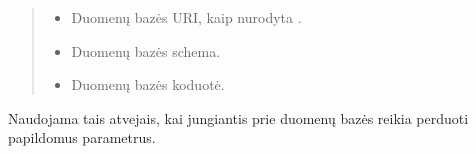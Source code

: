 \documentclass[letterpaper,10pt,lithuanian]{sphinxmanual}
\begin{document}
\begin{fulllineitems}

\pysigstartsignatures
{}
\pysigstopsignatures{}

\begin{fulllineitems}
\label{\detokenize{saltiniai:connect}}
\pysigstartsignatures
{}
\pysigstopsignatures\begin{quote}\begin{description}
\begin{itemize}
\item {} 
\sphinxAtStartPar
{} \sphinxhyphen{}\sphinxhyphen{} Duomenų bazės URI, kaip nurodyta {\hyperref[\detokenize{saltiniai:sql-resource-source}]{}}.

\item {} 
\sphinxAtStartPar
{} \sphinxhyphen{}\sphinxhyphen{} Duomenų bazės schema.

\item {} 
\sphinxAtStartPar
{} \sphinxhyphen{}\sphinxhyphen{} Duomenų bazės koduotė.

\end{itemize}

\end{description}\end{quote}

\sphinxAtStartPar
Naudojama tais atvejais, kai jungiantis prie duomenų bazės reikia
perduoti papildomus parametrus.

\end{fulllineitems}


\end{fulllineitems}
\end{document}
